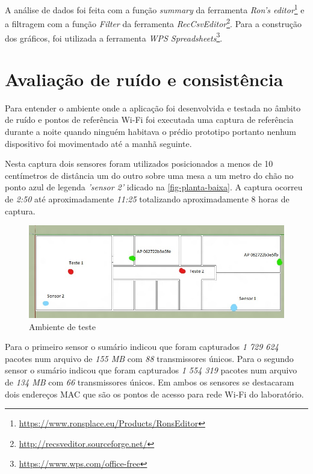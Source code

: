 A análise de dados foi feita com a função \emph{summary} da ferramenta
\emph{Ron’s editor}\footnote{\url{https://www.ronsplace.eu/Products/RonsEditor}}
e a filtragem com a função \emph{Filter} da ferramenta
\emph{RecCsvEditor}\footnote{\url{http://recsveditor.sourceforge.net/}}. Para a
construção dos gráficos, foi utilizada a ferramenta
\emph{WPS Spreadsheets}\footnote{\url{https://www.wps.com/office-free}}.

\clearpage
\section{Avaliação de ruído e consistência}
\label{sec:teste-ruido}


Para entender o ambiente onde a aplicação foi desenvolvida e testada no âmbito
de ruído e pontos de referência Wi-Fi foi executada uma captura de referência
durante a noite quando ninguém habitava o prédio prototipo portanto nenhum
dispositivo foi movimentado até a manhã seguinte.

Nesta captura dois sensores foram utilizados posicionados a menos de 10
centímetros de distância um do outro sobre uma mesa a um metro do chão no ponto
azul de legenda \emph{'sensor 2'} idicado na \autoref{fig-planta-baixa}. A captura
ocorreu de \emph{2:50} até aproximadamente \emph{11:25} totalizando aproximadamente 8 horas de
captura.

\begin{figure}[htb]
	\caption{\label{fig-planta-baixa}Ambiente de teste}
	\begin{center}
		\includegraphics[width=1\textwidth]{060-testes/data-analisis/planta-baixa_Ink_LI.jpg}
	\end{center}
\end{figure}


Para o primeiro sensor o sumário indicou que foram capturados \emph{1 729 624}
pacotes num arquivo de \emph{155 MB} com \emph{88} transmissores únicos.
Para o segundo sensor o sumário indicou que foram capturados \emph{1 554 319}
pacotes num arquivo de \emph{134 MB} com \emph{66} transmissores únicos.
Em ambos os sensores se destacaram dois endereços MAC que são os pontos de
acesso para rede Wi-Fi do laboratório.

